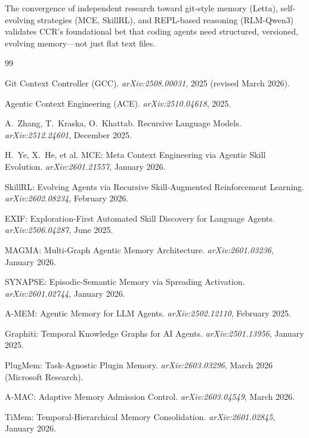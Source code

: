 \documentclass[11pt]{article}
\begin{document}
The convergence of independent research toward git-style memory (Letta), self-evolving strategies (MCE, SkillRL), and REPL-based reasoning (RLM-Qwen3) validates CCR's foundational bet that coding agents need structured, versioned, evolving memory---not just flat text files.


\begin{thebibliography}{99}

Git Context Controller (GCC).
\textit{arXiv:2508.00031}, 2025 (revised March 2026).

Agentic Context Engineering (ACE).
\textit{arXiv:2510.04618}, 2025.

A.~Zhang, T.~Kraska, O.~Khattab.
Recursive Language Models.
\textit{arXiv:2512.24601}, December 2025.

H.~Ye, X.~He, et al.
MCE: Meta Context Engineering via Agentic Skill Evolution.
\textit{arXiv:2601.21557}, January 2026.

SkillRL: Evolving Agents via Recursive Skill-Augmented Reinforcement Learning.
\textit{arXiv:2602.08234}, February 2026.

EXIF: Exploration-First Automated Skill Discovery for Language Agents.
\textit{arXiv:2506.04287}, June 2025.

MAGMA: Multi-Graph Agentic Memory Architecture.
\textit{arXiv:2601.03236}, January 2026.

SYNAPSE: Episodic-Semantic Memory via Spreading Activation.
\textit{arXiv:2601.02744}, January 2026.

A-MEM: Agentic Memory for LLM Agents.
\textit{arXiv:2502.12110}, February 2025.

Graphiti: Temporal Knowledge Graphs for AI Agents.
\textit{arXiv:2501.13956}, January 2025.

PlugMem: Task-Agnostic Plugin Memory.
\textit{arXiv:2603.03296}, March 2026 (Microsoft Research).

A-MAC: Adaptive Memory Admission Control.
\textit{arXiv:2603.04549}, March 2026.

TiMem: Temporal-Hierarchical Memory Consolidation.
\textit{arXiv:2601.02845}, January 2026.


\end{thebibliography}
\end{document}

